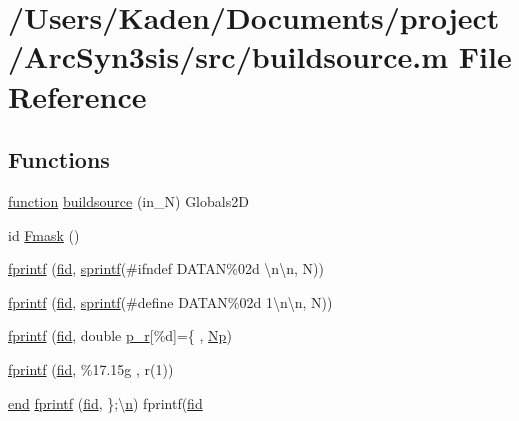 \hypertarget{a00575}{}\section{/\+Users/\+Kaden/\+Documents/project/\+Arc\+Syn3sis/src/buildsource.m File Reference}
\label{a00575}
\subsection*{Functions}
\begin{DoxyCompactItemize}
\item 
\hyperlink{a00611_a2420833d971716e9bab41cc9fb3abba1}{function} \hyperlink{a00575_a39d26c9ec5258e8eb8c2fa79f9d0f5d2}{buildsource} (in\+\_\+N) Globals2D
\item 
id \hyperlink{a00575_a53fedbe0b7d30bbdae17dd4984fb3177}{Fmask} ()
\item 
\hyperlink{a00575_ae43454b0430d35b4fd0121a12699f5f3}{fprintf} (\hyperlink{a00575_ae9011d40c6f13e68e6f07156e0da7c5d}{fid}, \hyperlink{a00575_ae6aab5c308faac0fc539cc9c6da9fbd0}{sprintf}(\textquotesingle{}\#ifndef D\+A\+T\+AN\%02d \textbackslash{}n\textbackslash{}n\textquotesingle{}, N))
\item 
\hyperlink{a00575_a0cefee7771fb890ebe078e02b3cbdd92}{fprintf} (\hyperlink{a00575_ae9011d40c6f13e68e6f07156e0da7c5d}{fid}, \hyperlink{a00575_ae6aab5c308faac0fc539cc9c6da9fbd0}{sprintf}(\textquotesingle{}\#define D\+A\+T\+AN\%02d 1\textbackslash{}n\textbackslash{}n\textquotesingle{}, N))
\item 
\hyperlink{a00575_abb4efbfe4a700e7b6f9b753ddf618c7c}{fprintf} (\hyperlink{a00575_ae9011d40c6f13e68e6f07156e0da7c5d}{fid}, \textquotesingle{}double \hyperlink{a00551_afd03dd8992d711dd9cc495b5bb329bbf}{p\+\_\+r}\mbox{[}\%d\mbox{]}=\{ \textquotesingle{}, \hyperlink{a00575_abe50207e56666a60c81e2a58f522eea3}{Np})
\item 
\hyperlink{a00575_a3004316c15b29a8ab9ae9cfd1abb8af9}{fprintf} (\hyperlink{a00575_ae9011d40c6f13e68e6f07156e0da7c5d}{fid}, \textquotesingle{}\%17.\+15g \textquotesingle{}, r(1))
\item 
\hyperlink{a00608_afb358f48b1646c750fb9da6c6585be2b}{end} \hyperlink{a00575_a67deb27817ed521211fb44690a8df200}{fprintf} (\hyperlink{a00575_ae9011d40c6f13e68e6f07156e0da7c5d}{fid}, \textquotesingle{}\};\textbackslash{}\hyperlink{a00623_a781a04ab095280f838ff3eb0e51312e0}{n}\textquotesingle{}) fprintf(\hyperlink{a00575_ae9011d40c6f13e68e6f07156e0da7c5d}{fid}

\end{DoxyCompactItemize}
